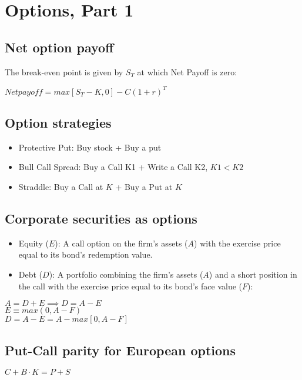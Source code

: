 \section{Options, Part 1}


\subsection*{Net option payoff}

The break-even point is given by $S_T$ at which Net Payoff is zero:

$Net payoff = max[S_T-K,0]-C(1+r)^T $


\subsection*{Option strategies}

\begin{itemize}[leftmargin=*]
	\item Protective Put: Buy stock + Buy a put
	\item Bull Call Spread: Buy a Call K1 + Write a Call K2, $K1<K2$
	\item Straddle: Buy a Call at $K$ + Buy a Put at $K$
\end{itemize} 

\subsection*{Corporate securities as options}
\begin{itemize}
	\item Equity ($E$): A call option on the firm’s assets ($A$) with the exercise price
	equal to its bond’s redemption value.
	\item Debt ($D$): A portfolio combining the firm’s assets ($A$) and a short position in
	the call with the exercise price equal to its bond’s face value ($F$):
	
\end{itemize}


$ A = D+E \implies D=A-E$ \\
$ E \equiv max(0,A-F) $ \\
$ D=A-E=A-max[0,A-F]$

\subsection*{Put-Call parity for European options}

$ C + B \cdot K = P + S$


